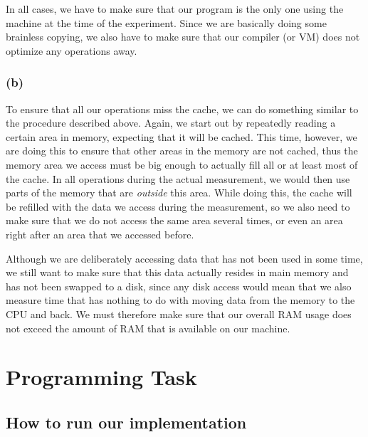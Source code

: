 \documentclass[12pt,a4paper]{article}
\begin{document}
In all cases, we have to make sure that our program is the only one using the machine at the time of the experiment. Since we are basically doing some brainless copying, we also have to make sure that our compiler (or VM) does not optimize any operations away.

\subsubsection*{(b)}
To ensure that all our operations miss the cache, we can do something similar to the procedure described above. Again, we start out by repeatedly reading a certain area in memory, expecting that it will be cached. This time, however, we are doing this to ensure that other areas in the memory are not cached, thus the memory area we access must be big enough to actually fill all or at least most of the cache. In all operations during the actual measurement, we would then use parts of the memory that are \emph{outside} this area. While doing this, the cache will be refilled with the data we access during the measurement, so we also need to make sure that we do not access the same area several times, or even an area right after an area that we accessed before.

Although we are deliberately accessing data that has not been used in some time, we still want to make sure that this data actually resides in main memory and has not been swapped to a disk, since any disk access would mean that we also measure time that has nothing to do with moving data from the memory to the CPU and back. We must therefore make sure that our overall RAM usage does not exceed the amount of RAM that is available on our machine.

\section*{Programming Task}
\label{sec:programming}

\subsection*{How to run our implementation}
\end{document}
